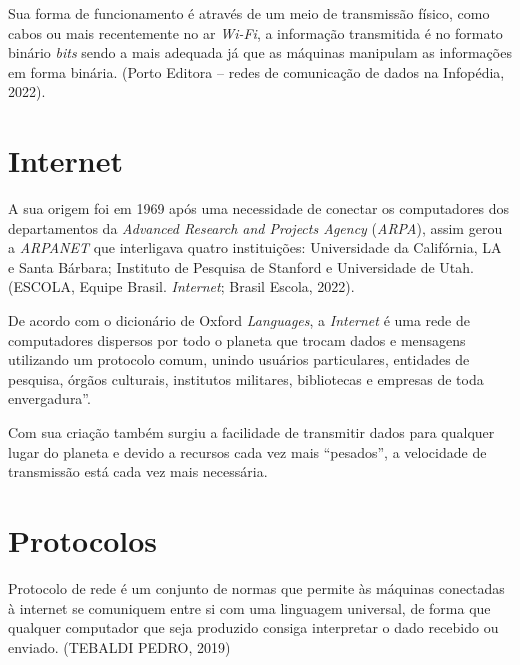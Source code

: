 \par Sua forma de funcionamento é através de um meio de transmissão físico, como cabos ou mais recentemente no ar \textit{Wi-Fi}, a informação transmitida é no formato binário \textit{bits} sendo a mais adequada já que as máquinas manipulam as informações em forma binária. (Porto Editora – redes de comunicação de dados na Infopédia, 2022).

\newpage\thispagestyle{empty}
\section{\textbf{Internet}}
\par A sua origem foi em 1969 após uma necessidade de conectar os computadores dos departamentos da \textit{Advanced Research and Projects Agency} (\textit{ARPA}), assim gerou a \textit{ARPANET} que interligava quatro instituições: Universidade da Califórnia, LA e Santa Bárbara; Instituto de Pesquisa de Stanford e Universidade de Utah. (ESCOLA, Equipe Brasil. \textit{Internet}; Brasil Escola, 2022).

\par De acordo com o dicionário de Oxford \textit{Languages}, a \textit{Internet} é uma rede de computadores dispersos por todo o planeta que trocam dados e mensagens utilizando um protocolo comum, unindo usuários particulares, entidades de pesquisa, órgãos culturais, institutos militares, bibliotecas e empresas de toda envergadura”.

\par Com sua criação também surgiu a facilidade de transmitir dados para qualquer lugar do planeta e devido a recursos cada vez mais “pesados”, a velocidade de transmissão está cada vez mais necessária.


\newpage\thispagestyle{empty}
\section{\textbf{Protocolos}}

\par Protocolo de rede é um conjunto de normas que permite às máquinas conectadas à internet se comuniquem entre si com uma linguagem universal, de forma que qualquer computador que seja produzido consiga interpretar o dado recebido ou enviado. (TEBALDI PEDRO, 2019)

